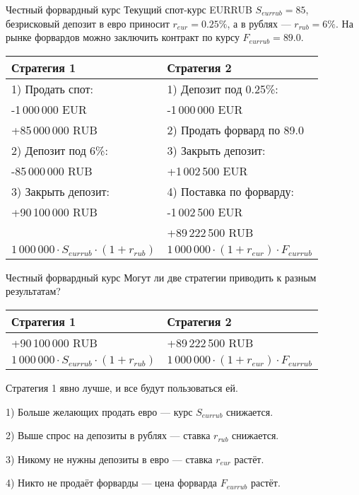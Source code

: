 \documentclass{beamer}
\begin{document}
\begin{frame}{Честный форвардный курс}
\justify
Текущий спот-курс EURRUB $S_{eurrub}=85$, безрисковый депозит в евро 
приносит $r_{eur}=0.25\%$, а в рублях --- $r_{rub}=6\%$. 
На рынке форвардов можно заключить контракт по курсу $F_{eurrub}=89.0$.

\justify
\centering
\begin{tabular}{l|l}
Стратегия 1 & Стратегия 2 \\ \hline
1) Продать спот:    & 1) Депозит под 0.25\%: \\
-1\,000\,000 EUR    & -1\,000\,000 EUR \\
+85\,000\,000 RUB   & 2) Продать форвард по 89.0 \\ \cline{2-2}
2) Депозит под 6\%: & 3) Закрыть депозит: \\
-85\,000\,000 RUB   & +1\,002\,500 EUR \\ \cline{1-1}
3) Закрыть депозит: & 4) Поставка по форварду: \\
+90\,100\,000 RUB   & -1\,002\,500 EUR \\
                    & +89\,222\,500 RUB \\ \hline
$1\,000\,000 \cdot S_{eurrub} \cdot (1+r_{rub})$ & $1\,000\,000 \cdot (1+r_{eur}) \cdot F_{eurrub}$
\end{tabular}
\end{frame}



\begin{frame}{Честный форвардный курс}
\justify
Могут ли две стратегии приводить к разным результатам?

\justify
\centering
\begin{tabular}{l|l}
Стратегия 1 & Стратегия 2 \\ \hline
+90\,100\,000 RUB  & +89\,222\,500 RUB \\
$1\,000\,000 \cdot S_{eurrub} \cdot (1+r_{rub})$ & $1\,000\,000 \cdot (1+r_{eur}) \cdot F_{eurrub}$
\end{tabular}

\justify
Стратегия 1 явно лучше, и все будут пользоваться ей. 

1) Больше желающих продать евро --- курс $S_{eurrub}$ снижается.

2) Выше спрос на депозиты в рублях --- ставка $r_{rub}$ снижается.

3) Никому не нужны депозиты в евро --- ставка $r_{eur}$ растёт. 

4) Никто не продаёт форварды --- цена форварда $F_{eurrub}$ растёт.
\end{frame}
\end{document}
